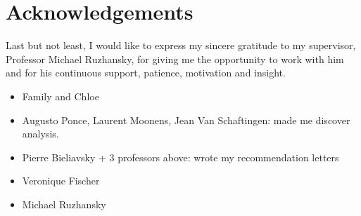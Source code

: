\chapter*{Acknowledgements}


Last but not least,
I would like to express my sincere gratitude to my supervisor,
Professor Michael Ruzhansky,
for giving me the opportunity to work with him and for his continuous support, patience, motivation and insight.

\begin{itemize}
    \item Family and Chloe
    \item Augusto Ponce, Laurent Moonens, Jean Van Schaftingen: made me discover analysis.
    \item Pierre Bieliavsky + 3 professors above: wrote my recommendation letters
    \item Veronique Fischer
    \item Michael Ruzhansky
\end{itemize}
